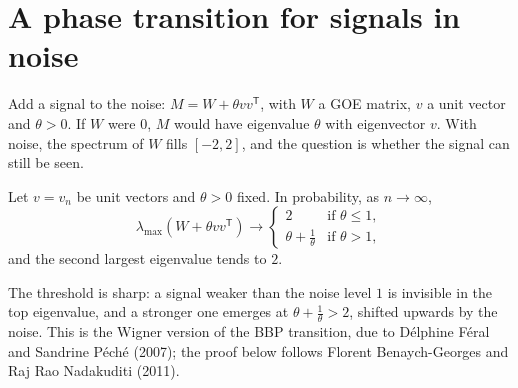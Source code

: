 \section{A phase transition for signals in noise}

Add a signal to the noise: $M=W+\theta vv^{\mathsf T}$, with $W$ a GOE matrix, $v$ a unit vector and $\theta>0$. If $W$ were $0$, $M$ would have eigenvalue $\theta$ with eigenvector $v$. With noise, the spectrum of $W$ fills
$[-2,2]$, and the question is whether the signal can still be seen.

\begin{theorem}\label{thm:spiked}
Let $v=v_n$ be unit vectors and $\theta>0$ fixed. In probability, as $n\to\infty$,
\[
\lambda_{\max}(W+\theta vv^{\mathsf T})\longrightarrow\begin{cases}2&\text{if }\theta\le1,\\\theta+\frac1\theta&\text{if }\theta>1,\end{cases}
\]
and the second largest eigenvalue tends to $2$.
\end{theorem}

The threshold is sharp: a signal weaker than the noise level $1$ is invisible in the top eigenvalue, and a stronger one emerges at $\theta+\frac1\theta>2$, shifted upwards by the noise. This is the Wigner version of the BBP
transition, due to D\'elphine F\'eral and Sandrine P\'ech\'e (2007); the proof below follows Florent Benaych-Georges and Raj Rao Nadakuditi (2011).

